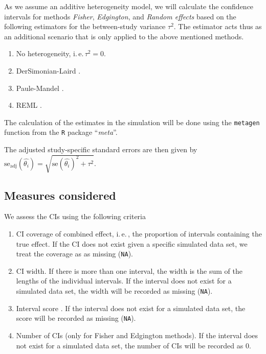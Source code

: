 \documentclass[letterpaper, 12pt]{article}
\newcommand{\ie}{{i.\,e.\,}}
\begin{document}
As we assume an additive heterogeneity model, we will calculate the confidence
intervals for methods \emph{Fisher}, \emph{Edgington}, and \emph{Random effects}
based on the following estimators for the between-study variance $\tau^2$. The
estimator acts thus as an additional scenario that is only applied to the above
mentioned methods.

\begin{enumerate}
  \item No heterogeneity, \ie $\tau^2 = 0$.
  \item DerSimonian-Laird \citep{ders:lair:86}.
  \item Paule-Mandel \citep{paul:man:82}.
  \item REML \citep{harv:77}.
\end{enumerate}

The calculation of the estimates in the simulation will be done using the
\texttt{metagen} function from the \texttt{R} package ``\emph{meta}''.

The adjusted study-specific standard errors are then given by
$\text{se}_{\text{adj}}(\hat{\theta_i}) = \sqrt{\text{se}(\hat{\theta_i})^2 + \tau^2}$.

\subsection{Measures considered} \label{sec:meas}

We assess the CIs using the following criteria
\begin{enumerate}
  \item CI coverage of combined effect, \ie, the proportion of intervals
    containing the true effect. If the CI does not exist given a specific
    simulated data set, we treat the coverage as as missing (\texttt{NA}).
  \item CI width. If there is more than one interval, the width is the sum of
    the lengths of the individual intervals. If the interval does not exist for
    a simulated data set, the width will be recorded as missing (\texttt{NA}).
  \item Interval score \citep{Gnei:Raft:07}. If the interval does not exist for
    a simulated data set, the score will be recorded as missing (\texttt{NA}).
  \item Number of CIs (only for Fisher and Edgington methods). If the interval
    does not exist for a simulated data set, the number of CIs will be recorded as
    0. %
\end{enumerate}
\end{document}

